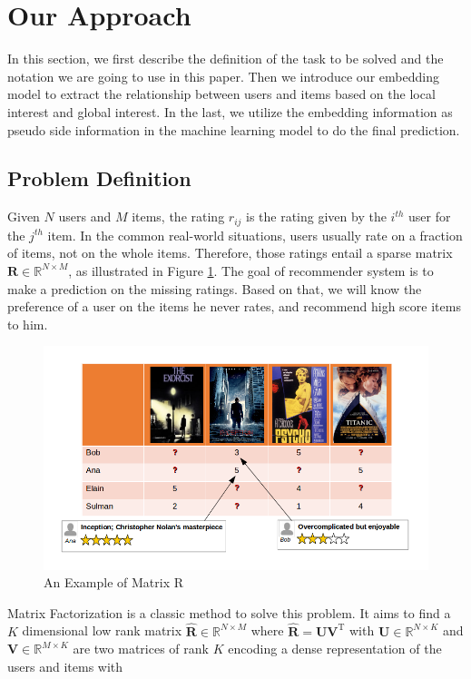 \documentclass{sig-alternate-05-2015}
\begin{document}
\section{Our Approach}
In this section,
we first describe the definition of the task to be solved and
the notation we are going to use in this paper. 
Then we introduce our embedding model to extract the relationship
between users and items based on the local interest and global interest.
In the last, we utilize the embedding information as pseudo side information
in the machine learning model to do the final prediction.

\subsection{Problem Definition}
Given $N$ users and $M$ items, the rating $r_{ij}$ is the rating given by
the $i^{th}$ user for the $j^{th}$ item.
In the common real-world situations,
users usually rate on a fraction of items, not on the whole items.
Therefore,
those ratings entail a sparse matrix $\mathbf{R} \in \mathbb{R}^{N \times M}$,
as illustrated in Figure \ref{fig:matrix}.
The goal of recommender system is to make a prediction on the missing ratings.
Based on that, we will know the preference of a user on the items he never rates,
and recommend high score items to him.

\begin{figure}[htbp]
	\centering
	\includegraphics[scale=0.4]{images/4.png}
	\caption{An Example of Matrix R}
	\label{fig:matrix}
\end{figure}

Matrix Factorization is a classic method to solve this problem.
It aims to find a $K$ dimensional low rank matrix $\mathbf{\hat{R}} \in \mathbb{R}^{N \times M}$
where $\mathbf{\hat{R}} = \mathbf{U} \mathbf{V}^\mathrm{T}$ with
$\mathbf{U} \in \mathbb{R}^{N \times K}$ and $\mathbf{V} \in \mathbb{R}^{M \times K}$
are two matrices of rank $K$ encoding a dense representation of the users and items with
\end{document}
